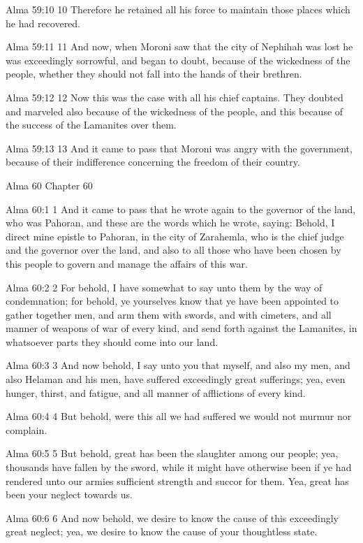 Alma 59:10
 10 Therefore he retained all his force to maintain those places
which he had recovered.

Alma 59:11
 11 And now, when Moroni saw that the city of Nephihah was lost
he was exceedingly sorrowful, and began to doubt, because of the
wickedness of the people, whether they should not fall into the
hands of their brethren.

Alma 59:12
 12 Now this was the case with all his chief captains. They
doubted and marveled also because of the wickedness of the
people, and this because of the success of the Lamanites over
them.

Alma 59:13
 13 And it came to pass that Moroni was angry with the
government, because of their indifference concerning the freedom
of their country.

Alma 60
Chapter 60

Alma 60:1
 1 And it came to pass that he wrote again to the governor of the
land, who was Pahoran, and these are the words which he wrote,
saying: Behold, I direct mine epistle to Pahoran, in the city of
Zarahemla, who is the chief judge and the governor over the land,
and also to all those who have been chosen by this people to
govern and manage the affairs of this war.

Alma 60:2
 2 For behold, I have somewhat to say unto them by the way of
condemnation; for behold, ye yourselves know that ye have been
appointed to gather together men, and arm them with swords, and
with cimeters, and all manner of weapons of war of every kind,
and send forth against the Lamanites, in whatsoever parts they
should come into our land.

Alma 60:3
 3 And now behold, I say unto you that myself, and also my men,
and also Helaman and his men, have suffered exceedingly great
sufferings; yea, even hunger, thirst, and fatigue, and all manner
of afflictions of every kind.

Alma 60:4
 4 But behold, were this all we had suffered we would not murmur
nor complain.

Alma 60:5
 5 But behold, great has been the slaughter among our people;
yea, thousands have fallen by the sword, while it might have
otherwise been if ye had rendered unto our armies sufficient
strength and succor for them. Yea, great has been your neglect
towards us.

Alma 60:6
 6 And now behold, we desire to know the cause of this
exceedingly great neglect; yea, we desire to know the cause of
your thoughtless state.


